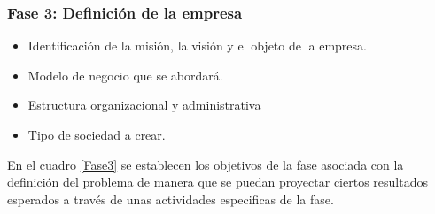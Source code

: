 \subsubsection{Fase 3: Definición de la empresa}
\begin{itemize}
    \item Identificación de la misión, la visión y el objeto de la empresa.
    \item Modelo de negocio que se abordará.
    \item Estructura organizacional y administrativa
    \item Tipo de sociedad a crear.
\end{itemize}
En el cuadro \ref{Fase3} se establecen los objetivos de la fase asociada con la definición del problema de manera que se puedan proyectar ciertos resultados esperados a través de unas actividades especificas de la fase.
\begin{adjustbox}{
            center,
             caption=[{Descripción de la fase 3}]{\centering Descripción de la fase 3. Fuente: : Autores.},
            label={Fase3},
            nofloat=table, , vspace={20px}}

        \end{adjustbox}

